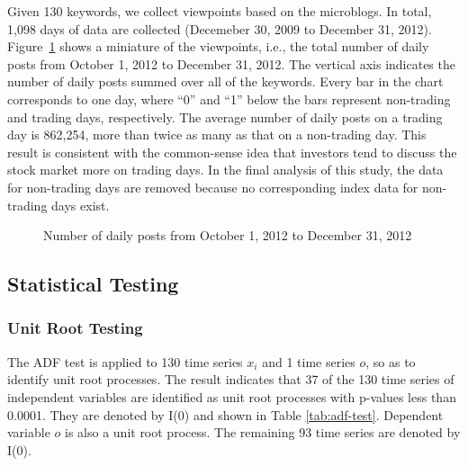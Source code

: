 \documentclass[review,3p,times,12pt,number]{elsarticle}
\begin{document}
Given 130 keywords, we collect viewpoints based on the microblogs. In total, 1,098 days of data are collected (Decemeber 30, 2009 to December 31, 2012). Figure~\ref{fig:weibo:trading} shows a miniature of the viewpoints, i.e., the total number of daily posts from October 1, 2012 to December 31, 2012. The vertical axis indicates the number of daily posts summed over all of the keywords. Every bar in the chart corresponds to one day, where ``0'' and ``1'' below the bars represent non-trading and trading days, respectively. The average number of daily posts on a trading day is 862,254, more than twice as many as that on a non-trading day. This result is consistent with the common-sense idea that investors tend to discuss the stock market more on trading days. In the final analysis of this study, the data for non-trading days are removed because no corresponding index data for non-trading days exist.
\begin{figure}[htbp]
\center
{}
\caption{Number of daily posts from October 1, 2012 to December 31, 2012}
\label{fig:weibo:trading}
\end{figure}

\subsection{Statistical Testing}
\subsubsection{Unit Root Testing}
The ADF test is applied to 130 time series $x_i$ and 1 time series $o$, so as to identify unit root processes.
The result indicates that 37 of the 130 time series of independent variables are identified as unit root processes with p-values less than 0.0001. They are denoted by I(0) and shown in Table \ref{tab:adf-test}. Dependent variable $o$ is also a unit root process. The remaining 93 time series are denoted by I(0).
\end{document}
